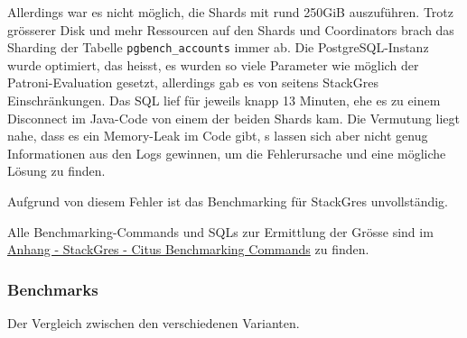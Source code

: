 \begin{flushleft}
    Allerdings war es nicht möglich, die Shards mit rund 250GiB auszuführen.
    Trotz grösserer Disk und mehr Ressourcen auf den Shards und Coordinators brach das Sharding der Tabelle \texttt{pgbench\_accounts} immer ab.
    Die PostgreSQL-Instanz wurde optimiert, das heisst, es wurden so viele Parameter wie möglich der Patroni-Evaluation gesetzt, allerdings gab es von seitens StackGres Einschränkungen.
    Das SQL lief für jeweils knapp 13 Minuten, ehe es zu einem Disconnect im Java-Code von einem der beiden Shards kam.
    Die Vermutung liegt nahe, dass es ein Memory-Leak im Code gibt, s lassen sich aber nicht genug Informationen aus den Logs gewinnen, um die Fehlerursache und eine mögliche Lösung zu finden.
    \begin{warning}
        Aufgrund von diesem Fehler ist das Benchmarking für StackGres unvollständig.
    \end{warning}
\end{flushleft}
\begin{flushleft}
    Alle Benchmarking-Commands und SQLs zur Ermittlung der Grösse sind im \hyperref[subsec:stackgres_citus_benchmarking_commands]{Anhang - StackGres - Citus Benchmarking Commands} zu finden.
\end{flushleft}
\clearpage
\begin{flushleft}
    \subsubsection{Benchmarks}
    Der Vergleich zwischen den verschiedenen Varianten.
\end{flushleft}
%
